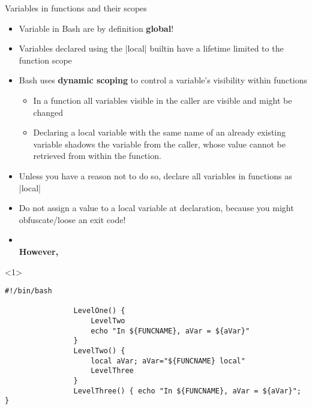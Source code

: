 \begin{frame}[fragile]{Variables in functions and their scopes}
    \vspace{-4mm}
    \begin{overlayarea}{\textwidth}{0.7\textheight}
        \begin{itemize}
            \item Variable in Bash are by definition \alert{\textbf{global}}!
            \item Variables declared using the \bash|local| builtin have a lifetime limited to the function scope
            \item Bash uses \textbf{dynamic scoping} to control a variable's visibility within functions
                  \begin{itemize}
                      \item In a function all variables visible in the caller are visible and might be changed
                      \item Declaring a local variable with the same name of an already existing variable shadows the variable from the caller, whose value cannot be retrieved from within the function.
                  \end{itemize}
            \item<only@3-> Unless you have a reason not to do so, declare all variables in functions as \bash|local|
            \item<only@3-> Do not assign a value to a local variable at declaration, because you might obfuscate/loose an exit code!
            \item<only@4-> \\
                           \textbf{However,} 
        \end{itemize}
        \begin{onlyenv}<1>
            \begin{lstlisting}[style=MyBash]
                #!/bin/bash

                LevelOne() {
                    LevelTwo
                    echo "In ${FUNCNAME}, aVar = ${aVar}"
                }
                LevelTwo() {
                    local aVar; aVar="${FUNCNAME} local"
                    LevelThree
                }
                LevelThree() { echo "In ${FUNCNAME}, aVar = ${aVar}"; }


\end{lstlisting}
\end{onlyenv}
\end{overlayarea}
\end{frame}
